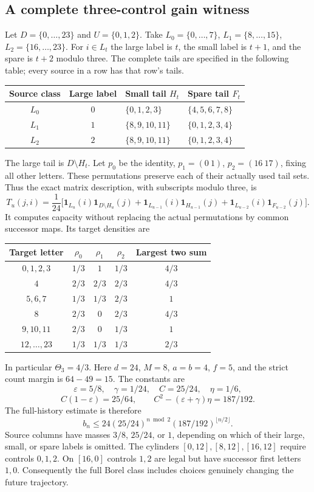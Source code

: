 \documentclass[11pt,reqno]{amsart}
\numberwithin{equation}{section}
\theoremstyle{definition}
\newcommand{\one}{\mathbf 1}
\newcommand{\eps}{\varepsilon}
\begin{document}
\subsection{A complete three-control gain witness}
Let $D=\{0,\ldots,23\}$ and $U=\{0,1,2\}$.
Take $L_0=\{0,\ldots,7\}$, $L_1=\{8,\ldots,15\}$,
$L_2=\{16,\ldots,23\}$. For $i\in L_t$ the large label is
$t$, the small label is $t+1$, and the spare is $t+2$ modulo three.
The complete tails are specified in the following table; every
source in a row has that row's tails.
\begin{center}
\begin{tabular}{ccll}
\toprule
Source class&Large label&Small tail $H_t$&Spare tail $F_t$\\
\midrule
$L_0$&$0$&$\{0,1,2,3\}$&$\{4,5,6,7,8\}$\\
$L_1$&$1$&$\{8,9,10,11\}$&$\{0,1,2,3,4\}$\\
$L_2$&$2$&$\{8,9,10,11\}$&$\{0,1,2,3,4\}$\\
\bottomrule
\end{tabular}
\end{center}
The large tail is $D\setminus H_t$. Let $p_0$ be the identity,
$p_1=(0\ 1)$, $p_2=(16\ 17)$, fixing all other letters.
These permutations preserve each of their actually used tail sets.
Thus the exact matrix description, with subscripts modulo three, is
\[
 T_u(j,i)=\frac1{24}\big[
 \one_{L_u}(i)\one_{D\setminus H_u}(j)+
 \one_{L_{u-1}}(i)\one_{H_{u-1}}(j)+
 \one_{L_{u-2}}(i)\one_{F_{u-2}}(j)\big].
\]
It computes capacity without replacing the actual permutations by
common successor maps. Its target densities are
\begin{center}
\begin{tabular}{c|ccc|c}
\toprule
Target letter&$\rho_0$&$\rho_1$&$\rho_2$&Largest two sum\\
\midrule
$0,1,2,3$&$1/3$&$1$&$1/3$&$4/3$\\
$4$&$2/3$&$2/3$&$2/3$&$4/3$\\
$5,6,7$&$1/3$&$1/3$&$2/3$&$1$\\
$8$&$2/3$&$0$&$2/3$&$4/3$\\
$9,10,11$&$2/3$&$0$&$1/3$&$1$\\
$12,\ldots,23$&$1/3$&$1/3$&$1/3$&$2/3$\\
\bottomrule
\end{tabular}
\end{center}
In particular $\Theta_3=4/3$. Here $d=24$, $M=8$, $a=b=4$,
$f=5$, and the strict count margin is $64-49=15$.
The constants are
\[
 \eps=5/8,\quad\gamma=1/24,\quad C=25/24,\quad\eta=1/6,
\]
\[
 C(1-\eps)=25/64,\qquad
 C^2-(\eps+\gamma)\eta=187/192.
\]
The full-history estimate is therefore
\begin{equation}\label{eq:gain-example}
 b_n\le24(25/24)^{n\bmod2}(187/192)^{\lfloor n/2\rfloor}.
\end{equation}
Source columns have masses $3/8$, $25/24$, or $1$, depending
on which of their large, small, or spare labels is omitted.
The cylinders $[0,12],[8,12],[16,12]$ require controls
$0,1,2$. On $[16,0]$ controls $1,2$ are legal but have successor
first letters $1,0$. Consequently the full Borel class includes
choices genuinely changing the future trajectory.
\end{document}
